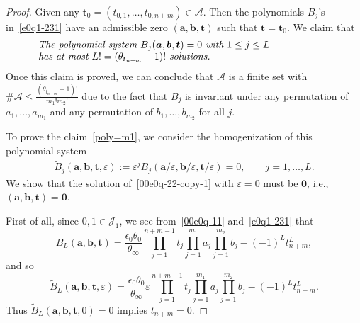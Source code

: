 \documentclass[pdftex]{sigma}
\numberwithin{equation}{section}
\begin{document}
\begin{proof}
Given any $\boldsymbol t_0=(t_{0,1},\dots,t_{0,n+m})\in \mathcal{A}$. Then the polynomials $B_j$'s in~\eqref{e0q1-231} have an admissible zero $(\boldsymbol a,\boldsymbol b,\boldsymbol t)$ such that $\boldsymbol t=\boldsymbol t_0$. We claim that
\begin{equation} \label{poly=m1}
 \parbox{\dimexpr\linewidth-5em}{\it
 The polynomial system $B_j(\boldsymbol a,\boldsymbol b,\boldsymbol t)=0$ with $1\leq j\leq L$\\ has at most $L!=(\theta_{t_{n+m}}-1)!$ solutions.
 }
\end{equation}
Once this claim is proved, we can conclude that $\mathcal{A}$ is a
finite set with $\# \mathcal{A}\leq
\frac{(\theta_{t_{n+m}}-1)!}{m_1!m_2!}$ due to the fact that $B_j$ is
invariant under any permutation of $a_1,\dots, a_{m_1}$ and any
permutation of $b_1,\dots, b_{m_2}$ for all $j$.

To prove the claim~\eqref{poly=m1}, we consider the homogenization of this polynomial system
\begin{equation}\label{00e0q-22-copy-1}
\begin{split}
\widetilde{B}_j(\boldsymbol a, \boldsymbol b,\boldsymbol t,\varepsilon):=\varepsilon^jB_j({\boldsymbol a}/\varepsilon, {\boldsymbol b}/\varepsilon, \boldsymbol t/\varepsilon)=0,\qquad j=1,\dots, L.
\end{split}
\end{equation}
We show that the solution of~\eqref{00e0q-22-copy-1} with $\varepsilon=0$ must be $\boldsymbol 0$,
i.e., $(\boldsymbol a, \boldsymbol b,\boldsymbol t)=\boldsymbol 0$.

First of all, since $0,1\in\mathcal{J}_1$, we see from~\eqref{00e0q-11} and~\eqref{e0q1-231} that
\begin{equation*}%
B_{L}(\boldsymbol a, \boldsymbol b,\boldsymbol t)=\frac{\epsilon_0\theta_0}{\theta_\infty} \prod_{j=1}^{n+m-1}t_j\prod_{j=1}^{m_1}a_j\prod_{j=1}^{m_2}b_j-(-1)^{L}
t_{n+m}^{L},
\end{equation*}
and so
\[\widetilde{B}_{L}(\boldsymbol a, \boldsymbol b,\boldsymbol t,\varepsilon)=\frac{\epsilon_0\theta_0}{\theta_\infty} \varepsilon \prod_{j=1}^{n+m-1}t_j\prod_{j=1}^{m_1}a_j\prod_{j=1}^{m_2}b_j-(-1)^{L}
t_{n+m}^{L}.\]
Thus $\widetilde{B}_{L}(\boldsymbol a, \boldsymbol b,\boldsymbol t,0)=0$ implies $t_{n+m}=0$.


\end{proof}
\end{document}
